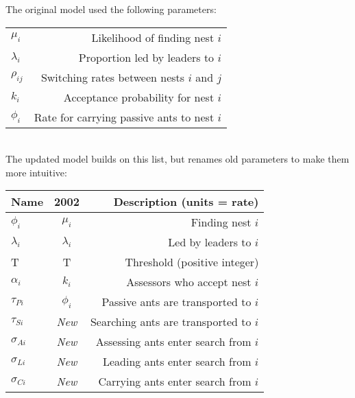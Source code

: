 \documentclass[letterpaper]{article}
\begin{document}
  The original model used the following parameters:\\

\begin{tabular}{ l | r }
    \hline
  $\mu_i$     & Likelihood of finding nest $i$\\
  $\lambda_i$ & Proportion led by leaders to $i$\\
  $\rho_{ij}$ & Switching rates between nests $i$ and $j$\\
  $k_i$       & Acceptance probability for nest $i$\\
  $\phi_i$    & Rate for carrying passive ants to nest $i$\\
    \hline
\end{tabular} \\

The updated model builds on this list, but renames old parameters to make them more intuitive: \\

\begin{tabular}{ l | c | r }
    \hline
  Name          & 2002        & Description (units = rate)\\ \hline
  $\phi_i$      & $\mu_i$     & Finding nest $i$\\
  $\lambda_i$   & $\lambda_i$ & Led by leaders to $i$\\
  T             & T           & Threshold (positive integer)\\
  $\alpha_i$    & $k_i$       & Assessors who accept nest $i$\\ \hline
  $\tau_{Pi}$   & $\phi_i$    & Passive ants are transported to $i$\\
  $\tau_{Si}$   & \em{New}    & Searching ants are transported to $i$\\ \hline
  $\sigma_{Ai}$ & \em{New}    & Assessing ants enter search from $i$\\
  $\sigma_{Li}$ & \em{New}    & Leading ants enter search from $i$\\
  $\sigma_{Ci}$ & \em{New}    & Carrying ants enter search from $i$\\
  \hline
\end{tabular} \\

\end{document}
